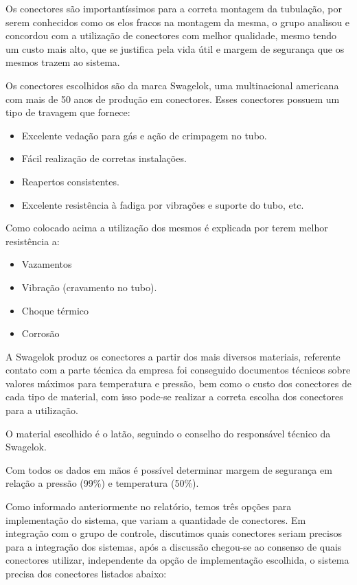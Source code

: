 Os conectores são importantíssimos para a correta montagem da tubulação, por serem conhecidos como os elos fracos na montagem da mesma, o grupo analisou e concordou com a utilização de conectores com melhor qualidade, mesmo tendo um custo mais alto, que se justifica pela vida útil e margem de segurança que os mesmos trazem ao sistema.

Os conectores escolhidos são da marca Swagelok, uma multinacional americana com mais de 50 anos de produção em conectores. Esses conectores possuem um tipo de travagem que fornece:
\begin{itemize}
\item Excelente vedação para gás e ação de crimpagem no tubo.
\item Fácil realização de corretas instalações.
\item Reapertos consistentes.
\item Excelente resistência à fadiga por vibrações e suporte do tubo, etc.
\end{itemize}

Como colocado acima a utilização dos mesmos é explicada por terem melhor resistência a:

\begin{itemize}
\item Vazamentos
\item Vibração (cravamento no tubo).
\item Choque térmico
\item Corrosão
\end{itemize}

A Swagelok produz os conectores a partir dos mais diversos materiais, referente contato com a parte técnica da empresa foi conseguido documentos técnicos sobre valores máximos para temperatura e pressão, bem como o custo dos conectores de cada tipo de material, com isso pode-se realizar a correta escolha dos conectores para a utilização.

O material escolhido é o latão, seguindo o conselho do responsável técnico da Swagelok.

Com todos os dados em mãos é possível determinar margem de segurança em relação a pressão (99\%) e temperatura (50\%).

Como informado anteriormente no relatório, temos três opções para implementação do sistema, que variam a quantidade de conectores. Em integração com o grupo de controle, discutimos quais conectores seriam precisos para a integração dos sistemas, após a discussão chegou-se ao consenso de quais conectores utilizar, independente da opção de implementação escolhida, o sistema precisa dos conectores listados abaixo:

